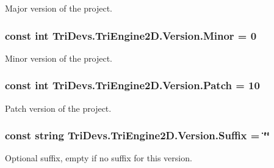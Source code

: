 Major version of the project. 

\hypertarget{class_tri_devs_1_1_tri_engine2_d_1_1_version_a46c99b37d8caad10a9702e9823f6cded}{
\subsubsection[{Minor}]{\setlength{\rightskip}{0pt plus 5cm}const int Tri\-Devs.\-Tri\-Engine2\-D.\-Version.\-Minor = 0}}\label{class_tri_devs_1_1_tri_engine2_d_1_1_version_a46c99b37d8caad10a9702e9823f6cded}


Minor version of the project. 

\hypertarget{class_tri_devs_1_1_tri_engine2_d_1_1_version_a5baa982b0404ea5ed3d2526e26f55809}{
\subsubsection[{Patch}]{\setlength{\rightskip}{0pt plus 5cm}const int Tri\-Devs.\-Tri\-Engine2\-D.\-Version.\-Patch = 10}}\label{class_tri_devs_1_1_tri_engine2_d_1_1_version_a5baa982b0404ea5ed3d2526e26f55809}


Patch version of the project. 

\hypertarget{class_tri_devs_1_1_tri_engine2_d_1_1_version_a5f7a61ae54163decac64e6acbe25e76d}{
\subsubsection[{Suffix}]{\setlength{\rightskip}{0pt plus 5cm}const string Tri\-Devs.\-Tri\-Engine2\-D.\-Version.\-Suffix = \char`\"{}\char`\"{}}}\label{class_tri_devs_1_1_tri_engine2_d_1_1_version_a5f7a61ae54163decac64e6acbe25e76d}


Optional suffix, empty if no suffix for this version. 

